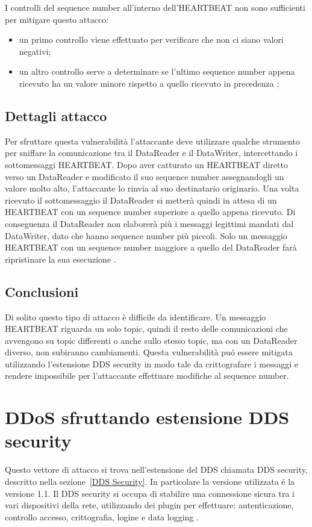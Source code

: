 I controlli del sequence number all'interno dell'HEARTBEAT 
non sono sufficienti per mitigare questo attacco:
\begin{itemize}
    \item un primo controllo viene effettuato per verificare che non ci siano 
    valori negativi;
    \item un altro controllo serve a determinare se l'ultimo sequence number
    appena ricevuto ha un valore minore rispetto a quello ricevuto in precedenza
    \cite{White2017AnII};
\end{itemize}


\subsection{Dettagli attacco}

Per sfruttare questa vulnerabilità l'attaccante deve utilizzare qualche 
strumento per sniffare la comunicazione tra il DataReader e il DataWriter,
intercettando i
sottomessaggi HEARTBEAT. Dopo aver catturato un HEARTBEAT diretto verso 
un DataReader e modificato 
il suo sequence number assegnandogli un valore molto alto, 
l'attaccante lo rinvia al suo destinatario originario.
Una volta ricevuto il sottomessaggio il DataReader si metterà quindi 
in attesa di un HEARTBEAT con un sequence number 
superiore a quello appena ricevuto. Di conseguenza il DataReader
non elaborerà più i messaggi legittimi mandati dal DataWriter,
dato che hanno sequence number più piccoli.
Solo un messaggio HEARTBEAT con un sequence number
maggiore a quello del DataReader farà ripristinare la sua esecuzione 
\cite{White2017AnII}.


\subsection{Conclusioni}
Di solito questo tipo di attacco è difficile da identificare. 
Un messaggio HEARTBEAT riguarda un solo topic, quindi il resto delle
comunicazioni che avvengono su topic differenti o anche sullo stesso 
topic, ma con un DataReader diverso, non subiranno cambiamenti.
Questa vulnerabilità puó essere mitigata utilizzando l'estensione
DDS security in modo tale da crittografare i messaggi e rendere 
impossibile per l'attaccante effettuare modifiche al 
sequence number. 


\section{DDoS sfruttando estensione DDS security}
Questo vettore di attacco si trova nell'estensione del DDS chiamata
DDS security, descritto nella sezione~\ref{DDS Security}. 
In particolare la versione utilizzata é la versione 1.1.
Il DDS security si occupa di stabilire una
connessione sicura tra i vari dispositivi della rete, utilizzando 
dei plugin per effettuare: autenticazione, controllo accesso, crittografia,
logine e data logging \cite{ddssecurity1.1}.

